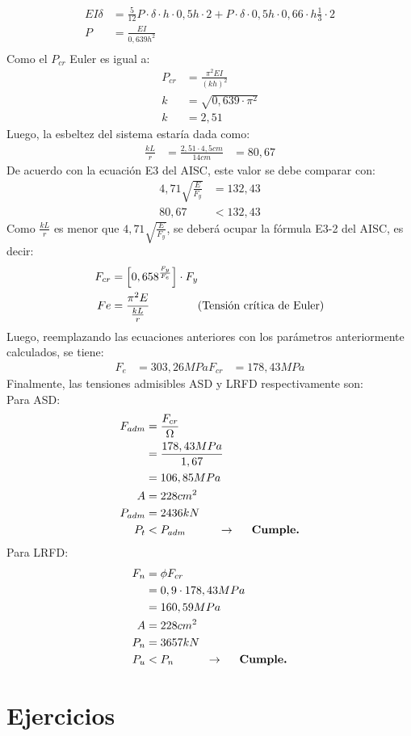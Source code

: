 \begin{example}
\begin{align*}
    EI\delta&=\frac{5}{12}P \cdot \delta \cdot h \cdot 0,5h \cdot 2+P \cdot \delta \cdot 0,5h \cdot 0,66 \cdot h \frac{1}{3} \cdot 2\\
    P&=\frac{EI}{0,639h^2}\\
\end{align*}
Como el $P_{cr}$ Euler es igual a:
\begin{align*}
    P_{cr} &= \frac{\pi^2 EI}{(kh)^2}\\
    k &= \sqrt{0,639\cdot\pi^2}\\
    k &= 2,51
\end{align*}
Luego, la esbeltez del sistema estaría dada como:
\begin{align*}
    \frac{kL}{r}&=\frac{2,51\cdot 4,5cm}{14cm}
    &=80,67
\end{align*}
De acuerdo con la ecuación E3 del AISC, este valor se debe comparar con:
\begin{align*}
    4,71\sqrt{\frac{E}{F_y}}&=132,43\\
    80,67&<132,43
\end{align*}
Como $\frac{kL}{r}$ es menor que $4,71\sqrt{\frac{E}{F_y}}$, se deberá ocupar la fórmula E3-2 del AISC, es decir:
\begin{align*}
    F_{cr}&=\left[0,658^\frac{F_y}{F_e}\right]\cdot F_y\\
    Fe&=\frac{\pi^2 E}{\frac{kL}{r}} \text{\hspace{15mm}(Tensión crítica de Euler)}
\end{align*}
Luego, reemplazando las ecuaciones anteriores con los parámetros anteriormente calculados, se tiene:
\begin{align*}
    F_e&=303,26 MPa
    F_{cr}&=178,43 MPa
\end{align*}
Finalmente, las tensiones admisibles ASD y LRFD respectivamente son:\\
Para ASD:\\
 \begin{align*}
     F_{adm}&=\frac{F_{cr}}{\Omega}\\
     &=\frac{178,43 MPa}{1,67}\\
     &=106,85 MPa\\
     A&=228cm^2\\
     P_{adm}&=2436kN\\
     P_{t}&<P_{adm}\hspace{10mm} \rightarrow\textbf{\hspace{5mm}Cumple.}
 \end{align*}
Para LRFD:\\
 \begin{align*}
     F_{n}&=\phi F_{cr}\\
     &=0,9\cdot 178,43 MPa\\
     &=160,59 MPa\\
     A&=228cm^2\\
     P_{n}&=3657kN\\
     P_u&<P_{n}\hspace{10mm} \rightarrow\textbf{\hspace{5mm}Cumple.}
 \end{align*}
\end{example}
\section{Ejercicios}